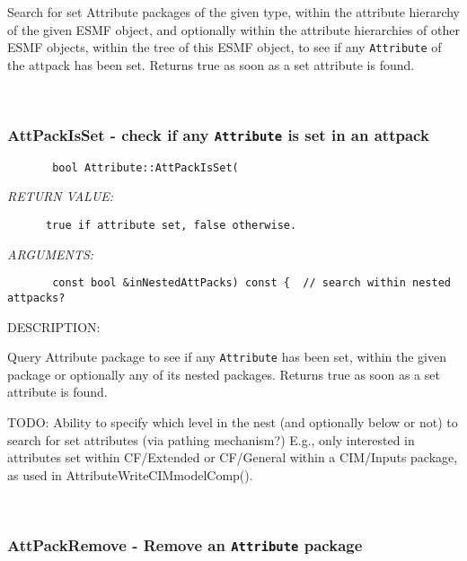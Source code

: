        Search for set Attribute packages of the given type, within the
       attribute hierarchy of the given ESMF object, and optionally within the
       attribute hierarchies of other ESMF objects, within the tree of this ESMF
       object, to see if any {\tt Attribute} of the attpack has been set.
       Returns true as soon as a set attribute is found.
   
 
\mbox{}\hrulefill\
 
\subsubsection [AttPackIsSet] {AttPackIsSet - check if any {\tt Attribute} is set in an attpack}


  
\begin{verbatim}       bool Attribute::AttPackIsSet(
   \end{verbatim}{\em RETURN VALUE:}
\begin{verbatim}      true if attribute set, false otherwise.
   \end{verbatim}{\em ARGUMENTS:}
\begin{verbatim}       const bool &inNestedAttPacks) const {  // search within nested attpacks?
   \end{verbatim}
{\sf DESCRIPTION:\\ }


       Query Attribute package to see if any {\tt Attribute} has been set,
       within the given package or optionally any of its nested packages.
       Returns true as soon as a set attribute is found.
  
       TODO: Ability to specify which level in the nest (and optionally below
             or not) to search for set attributes (via pathing mechanism?) 
             E.g., only interested in attributes set within CF/Extended or
             CF/General within a CIM/Inputs package, as used in
             AttributeWriteCIMmodelComp(). 
 
\mbox{}\hrulefill\
 
\subsubsection [AttPackRemove] {AttPackRemove - Remove an {\tt Attribute} package}


